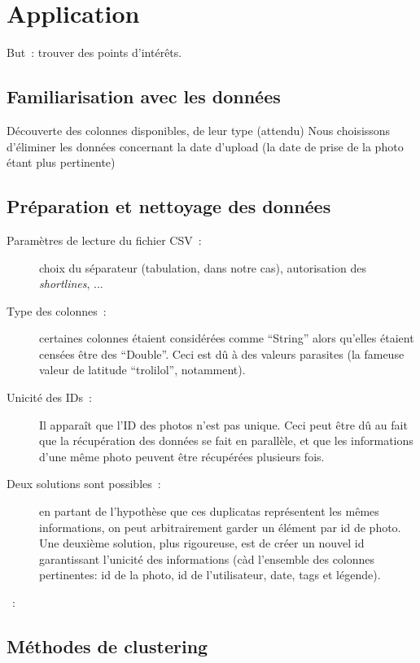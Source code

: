 \chapter{Application}
    But~: trouver des points d’intérêts.

\section{Familiarisation avec les données}
    Découverte des colonnes disponibles, de leur type (attendu)
    Nous choisissons d'éliminer les données concernant la date d'upload (la date de prise de la photo étant plus pertinente)


\section{Préparation et nettoyage des données}

    \begin{description}
        \item[Paramètres de lecture du fichier CSV~:] choix du séparateur (tabulation, dans notre cas), autorisation des \textit{shortlines}, ...
        \item[Type des colonnes~:] certaines colonnes étaient considérées comme ``String'' alors qu'elles étaient censées être des ``Double''. Ceci est dû à des valeurs parasites (la fameuse valeur de latitude ``trolilol'', notamment).
        \item[Unicité des IDs~:] Il apparaît que l'ID des photos n'est pas unique. Ceci peut être dû au fait que la récupération des données se fait en parallèle, et que les informations d'une même photo peuvent être récupérées plusieurs fois.
        \item[Deux solutions sont possibles~:] en partant de l'hypothèse que ces duplicatas représentent les mêmes informations, on peut arbitrairement garder un élément par id de photo. Une deuxième solution, plus rigoureuse, est de créer un nouvel id garantissant l'unicité des informations (càd l'ensemble des colonnes pertinentes: id de la photo, id de l'utilisateur, date, tags et légende).
        \item[~:]
    \end{description}


\section{Méthodes de clustering}

